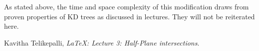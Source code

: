 As stated above, the time and space complexity of this modification draws from proven properties of KD trees as discussed in lectures.
They will not be reiterated here.

\begin{thebibliography}{9}

  Kavitha Telikepalli,
  \emph{\LaTeX: Lecture 3: Half-Plane intersections}.

\end{thebibliography}


